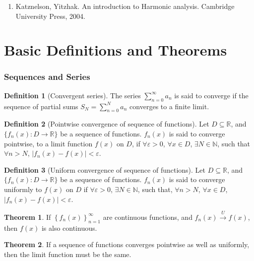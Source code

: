 \documentclass[fleqn, a4paper, 12pt, twoside]{article}
\theoremstyle{definition}
\newtheorem{definition}{Definition}
\theoremstyle{theorem}
\newtheorem{theorem}{Theorem}
\begin{document}
\begin{enumerate}
	\item Katznelson, Yitzhak. An introduction to Harmonic analysis. Cambridge University Press, 2004.
\end{enumerate}

\newpage
\part{Basic Definitions and Theorems}
\section{Sequences and Series}

\begin{definition}[Convergent series]
	The series $\sum\limits_{n = 0}^{\infty} a_n$ is said to converge if the sequence of partial sums $S_N = \sum\limits_{n = 0}^{N} a_n$ converges to a finite limit.
\end{definition}

\begin{definition}[Pointwise convergence of sequence of functions]
	Let $D \subseteq \mathbb{R}$, and $\{f_n(x) : D \to \mathbb{R}\}$ be a sequence of functions.
	$f_n(x)$ is said to converge pointwise, to a limit function $f(x)$ on $D$, if $\forall \varepsilon > 0$, $\forall x \in D$, $\exists N \in \mathbb{N}$, such that $\forall n > N$, $\left| f_n(x) - f(x) \right| < \varepsilon$.
\end{definition}

\begin{definition}[Uniform convergence of sequence of functions]
	Let $D \subseteq \mathbb{R}$, and $\{f_n(x) : D \to \mathbb{R}\}$ be a sequence of functions.
	$f_n(x)$ is said to converge uniformly to $f(x)$ on $D$ if $\forall \varepsilon > 0$, $\exists N \in \mathbb{N}$, such that, $\forall n > N$, $\forall x \in D$, $\left| f_n(x) - f(x) \right| < \varepsilon$.
\end{definition}

\begin{theorem}
	If $\left\{ f_n(x) \right\}_{n = 1}^{\infty}$ are continuous functions, and $f_n(x) \xrightarrow{U} f(x)$, then $f(x)$ is also continuous.
\end{theorem}

\begin{theorem}
	If a sequence of functions converges pointwise as well as uniformly, then the limit function must be the same.
\end{theorem}
\end{document}
